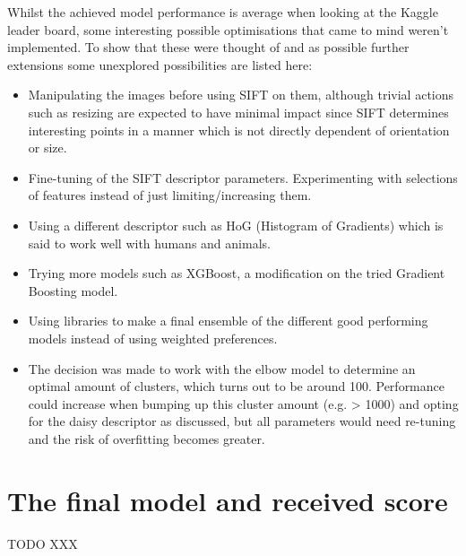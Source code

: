 Whilst the achieved model performance is average when looking at the Kaggle leader board, some interesting possible optimisations that came to mind weren't implemented.
To show that these were thought of and as possible further extensions some unexplored possibilities are listed here:
\begin{itemize}
    \item Manipulating the images before using SIFT on them, although trivial actions such as resizing are expected to have minimal impact since SIFT determines interesting points in a manner which is not directly dependent of orientation or size.
    \item Fine-tuning of the SIFT descriptor parameters. Experimenting with selections of features instead of just limiting/increasing them.
    \item Using a different descriptor such as HoG (Histogram of Gradients) which is said to work well with humans and animals.
    \item Trying more models such as XGBoost, a modification on the tried Gradient Boosting model.
    \item Using libraries to make a final ensemble of the different good performing models instead of using weighted preferences.
    \item The decision was made to work with the elbow model to determine an optimal amount of clusters, which turns out to be around 100. Performance could increase when bumping up this cluster amount (e.g. > 1000) and opting for the daisy descriptor as discussed, but all parameters would need re-tuning and the risk of overfitting becomes greater.
\end{itemize}


\section{The final model and received score}
\label{section:opt_score}

TODO XXX